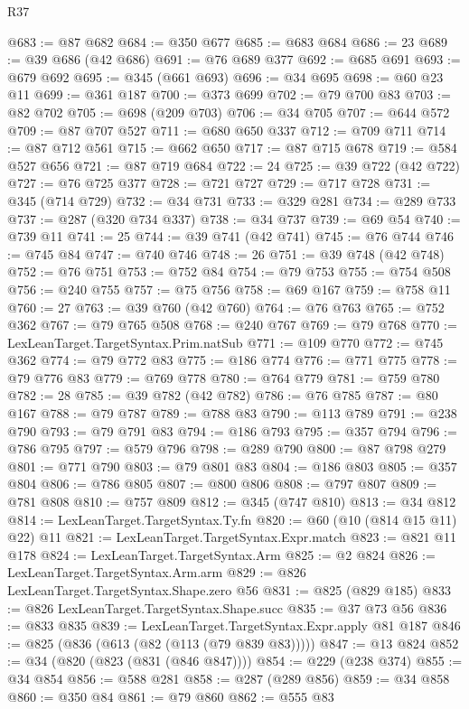 \begin{lexlean}{R37}
\begin{coremodule}
@683 := @87 @682
@684 := @350 @677
@685 := @683 @684
@686 := 23
@689 := @39 @686 (@42 @686)
@691 := @76 @689 @377
@692 := @685 @691
@693 := @679 @692
@695 := @345 (@661 @693)
@696 := @34 @695
@698 := @60 @23 @11
@699 := @361 @187
@700 := @373 @699
@702 := @79 @700 @83
@703 := @82 @702
@705 := @698 (@209 @703)
@706 := @34 @705
@707 := @644 @572
@709 := @87 @707 @527
@711 := @680 @650 @337
@712 := @709 @711
@714 := @87 @712 @561
@715 := @662 @650
@717 := @87 @715 @678
@719 := @584 @527 @656
@721 := @87 @719 @684
@722 := 24
@725 := @39 @722 (@42 @722)
@727 := @76 @725 @377
@728 := @721 @727
@729 := @717 @728
@731 := @345 (@714 @729)
@732 := @34 @731
@733 := @329 @281
@734 := @289 @733
@737 := @287 (@320 @734 @337)
@738 := @34 @737
@739 := @69 @54
@740 := @739 @11
@741 := 25
@744 := @39 @741 (@42 @741)
@745 := @76 @744
@746 := @745 @84
@747 := @740 @746
@748 := 26
@751 := @39 @748 (@42 @748)
@752 := @76 @751
@753 := @752 @84
@754 := @79 @753
@755 := @754 @508
@756 := @240 @755
@757 := @75 @756
@758 := @69 @167
@759 := @758 @11
@760 := 27
@763 := @39 @760 (@42 @760)
@764 := @76 @763
@765 := @752 @362
@767 := @79 @765 @508
@768 := @240 @767
@769 := @79 @768
@770 := LexLeanTarget.TargetSyntax.Prim.natSub
@771 := @109 @770
@772 := @745 @362
@774 := @79 @772 @83
@775 := @186 @774
@776 := @771 @775
@778 := @79 @776 @83
@779 := @769 @778
@780 := @764 @779
@781 := @759 @780
@782 := 28
@785 := @39 @782 (@42 @782)
@786 := @76 @785
@787 := @80 @167
@788 := @79 @787
@789 := @788 @83
@790 := @113 @789
@791 := @238 @790
@793 := @79 @791 @83
@794 := @186 @793
@795 := @357 @794
@796 := @786 @795
@797 := @579 @796
@798 := @289 @790
@800 := @87 @798 @279
@801 := @771 @790
@803 := @79 @801 @83
@804 := @186 @803
@805 := @357 @804
@806 := @786 @805
@807 := @800 @806
@808 := @797 @807
@809 := @781 @808
@810 := @757 @809
@812 := @345 (@747 @810)
@813 := @34 @812
@814 := LexLeanTarget.TargetSyntax.Ty.fn
@820 := @60 (@10 (@814 @15 @11) @22) @11
@821 := LexLeanTarget.TargetSyntax.Expr.match
@823 := @821 @11 @178
@824 := LexLeanTarget.TargetSyntax.Arm
@825 := @2 @824
@826 := LexLeanTarget.TargetSyntax.Arm.arm
@829 := @826 LexLeanTarget.TargetSyntax.Shape.zero @56
@831 := @825 (@829 @185)
@833 := @826 LexLeanTarget.TargetSyntax.Shape.succ
@835 := @37 @73 @56
@836 := @833 @835
@839 := LexLeanTarget.TargetSyntax.Expr.apply @81 @187
@846 := @825 (@836 (@613 (@82 (@113 (@79 @839 @83)))))
@847 := @13 @824
@852 := @34 (@820 (@823 (@831 (@846 @847))))
@854 := @229 (@238 @374)
@855 := @34 @854
@856 := @588 @281
@858 := @287 (@289 @856)
@859 := @34 @858
@860 := @350 @84
@861 := @79 @860
@862 := @555 @83

\end{coremodule}
\end{lexlean}
